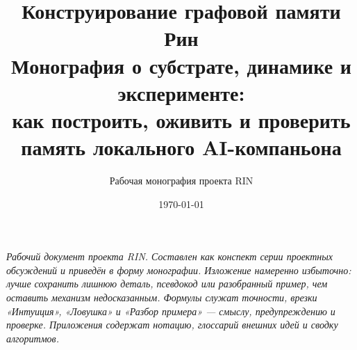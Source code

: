 \documentclass[11pt,a4paper]{extbook}
\title{Конструирование графовой памяти Рин\\[0.4em]
\large Монография о субстрате, динамике и эксперименте:\\
как построить, оживить и проверить память локального AI-компаньона}
\author{Рабочая монография проекта RIN}
\date{\today}
\theoremstyle{definition}
\begin{document}
\frontmatter
\maketitle

\vspace{1.5em}
\begin{center}
\begin{minipage}{0.82\textwidth}\itshape\small
Рабочий документ проекта RIN. Составлен как конспект серии проектных обсуждений и
приведён в форму монографии. Изложение намеренно избыточно: лучше сохранить лишнюю
деталь, псевдокод или разобранный пример, чем оставить механизм недосказанным.
Формулы служат точности, врезки «Интуиция», «Ловушка» и «Разбор примера» — смыслу,
предупреждению и проверке. Приложения содержат нотацию, глоссарий внешних идей и
сводку алгоритмов.
\end{minipage}
\end{center}
\vspace{1.5em}

\tableofcontents

\mainmatter





















\appendix








\backmatter

\end{document}
